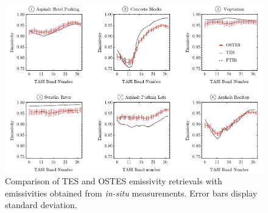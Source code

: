\begin{figure}[!t]
\centering
\includegraphics[width=\linewidth]{pics/Chapter_04/Brno-Emissivity-Comparison.pdf}
\vspace{1.5 em}
\caption{Comparison of TES and OSTES emissivity retrievals with emissivities obtained from \textit{in-situ} measurements. Error bars display standard deviation.}
\label{fig:BrnoEmissivityComparison}
\end{figure}


